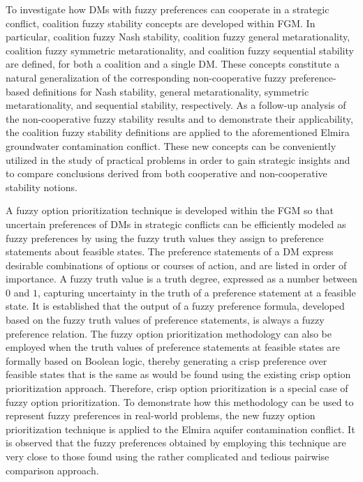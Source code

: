 To investigate how DMs with fuzzy preferences can cooperate in a strategic conflict, coalition fuzzy stability concepts are developed within FGM. In particular, coalition fuzzy Nash stability, coalition fuzzy general metarationality, coalition fuzzy symmetric metarationality, and coalition fuzzy sequential stability are defined, for both a coalition and a single DM. These concepts constitute a natural generalization of the corresponding non-cooperative fuzzy preference-based definitions for Nash stability, general metarationality, symmetric metarationality, and sequential stability, respectively. As a follow-up analysis of the non-cooperative fuzzy stability results and to demonstrate their applicability, the coalition fuzzy stability definitions are applied to the aforementioned Elmira groundwater contamination conflict. These new concepts can be conveniently utilized in the study of practical problems in order to gain strategic insights and to compare conclusions derived from both cooperative and non-cooperative stability notions.

A fuzzy option prioritization technique is developed within the FGM so that uncertain preferences of DMs in strategic conflicts can be efficiently modeled as fuzzy preferences by using the fuzzy truth values they assign to preference statements about feasible states. The preference statements of a DM express desirable combinations of options or courses of action, and are listed in order of importance. A fuzzy truth value is a truth degree, expressed as a number between $0$ and $1$, capturing uncertainty in the truth of a preference statement at a feasible state. It is established that the output of a fuzzy preference formula, developed based on the fuzzy truth values of preference statements, is always a fuzzy preference relation. The fuzzy option prioritization methodology can also be employed when the truth values of preference statements at feasible states are formally based on Boolean logic, thereby generating a crisp preference over feasible states that is the same as would be found using the existing crisp option prioritization approach. Therefore, crisp option prioritization is a special case of fuzzy option prioritization. To demonstrate how this methodology can be used to represent fuzzy preferences in real-world problems, the new fuzzy option prioritization technique is applied to the Elmira aquifer contamination conflict. It is observed that the fuzzy preferences obtained by employing this technique are very close to those found using the rather complicated and tedious pairwise comparison approach.

